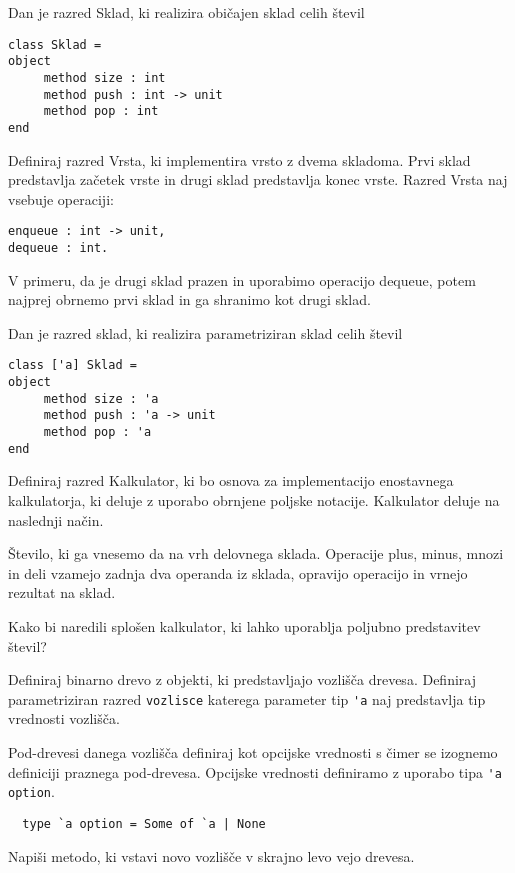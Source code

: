 \begin{ex}
Dan je razred Sklad, ki realizira obi\v cajen sklad celih \v stevil

\begin{lstlisting}
class Sklad =
object 
     method size : int
     method push : int -> unit
     method pop : int
end

\end{lstlisting}
Definiraj razred Vrsta, ki implementira vrsto z dvema skladoma. Prvi sklad predstavlja za\v cetek vrste in drugi sklad predstavlja konec vrste. Razred Vrsta naj vsebuje operaciji: 

\begin{lstlisting}
enqueue : int -> unit, 
dequeue : int. 

\end{lstlisting}
V primeru, da je drugi sklad prazen in uporabimo operacijo dequeue, potem najprej obrnemo prvi sklad in ga shranimo kot drugi sklad.

\end{ex}
\begin{ex}
Dan je razred sklad, ki realizira parametriziran sklad celih \v stevil
\begin{lstlisting}
class ['a] Sklad =
object 
     method size : 'a
     method push : 'a -> unit
     method pop : 'a
end
\end{lstlisting}
Definiraj razred Kalkulator, ki bo osnova za implementacijo enostavnega kalkulatorja, ki deluje z uporabo obrnjene poljske notacije. Kalkulator deluje na naslednji na\v cin.  

\v Stevilo, ki ga vnesemo da na vrh delovnega sklada. Operacije plus, minus, mnozi in deli vzamejo zadnja dva operanda iz sklada, opravijo operacijo in vrnejo rezultat na sklad. 

Kako bi naredili splo\v sen kalkulator, ki lahko uporablja poljubno predstavitev \v stevil?


\end{ex} 
\begin{ex}
  Definiraj binarno drevo z objekti, ki predstavljajo vozli\v s\v
  ca drevesa. Definiraj parametriziran razred \lstinline{vozlisce}
  katerega parameter tip \lstinline{'a} naj predstavlja tip vrednosti
  vozli\v s\v ca.

  Pod-drevesi danega vozli\v s\v ca definiraj kot opcijske vrednosti s
  \v cimer se izognemo definiciji praznega pod-drevesa. Opcijske
  vrednosti definiramo z uporabo tipa \lstinline{'a option}.

  \begin{lstlisting}
  type `a option = Some of `a | None
\end{lstlisting}

  Napi\v si metodo, ki vstavi novo vozli\v s\v ce v skrajno levo vejo
  drevesa.

 
\end{ex} 
